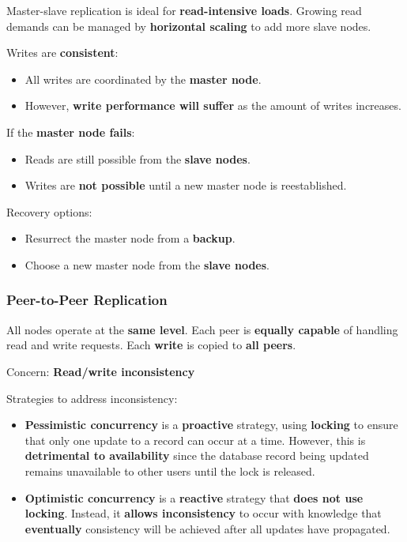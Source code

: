 \documentclass[12pt,a4paper]{report}
\begin{document}
Master-slave replication is ideal for \textbf{read-intensive loads}. Growing read demands can be managed by \textbf{horizontal scaling} to add more slave nodes.

Writes are \textbf{consistent}:
\begin{itemize}
  \item All writes are coordinated by the \textbf{master node}.
  \item However, \textbf{write performance will suffer} as the amount of writes increases.
\end{itemize}

If the \textbf{master node fails}:
\begin{itemize}
  \item Reads are still possible from the \textbf{slave nodes}.
  \item Writes are \textbf{not possible} until a new master node is reestablished.
\end{itemize}

Recovery options:
\begin{itemize}
  \item Resurrect the master node from a \textbf{backup}.
  \item Choose a new master node from the \textbf{slave nodes}.
\end{itemize}

\subsubsection{Peer-to-Peer Replication}
All nodes operate at the \textbf{same level}. Each peer is \textbf{equally capable} of handling read and write requests. Each \textbf{write} is copied to \textbf{all peers}.

\begin{important}
Concern: \textbf{Read/write inconsistency}
\end{important}

Strategies to address inconsistency:
\begin{itemize}
  \item \textbf{Pessimistic concurrency} is a \textbf{proactive} strategy, using \textbf{locking} to ensure that only one update to a record can occur at a time. However, this is \textbf{detrimental to availability} since the database record being updated remains unavailable to other users until the lock is released.
  \item \textbf{Optimistic concurrency} is a \textbf{reactive} strategy that \textbf{does not use locking}. Instead, it \textbf{allows inconsistency} to occur with knowledge that \textbf{eventually} consistency will be achieved after all updates have propagated.
\end{itemize}
\end{document}
